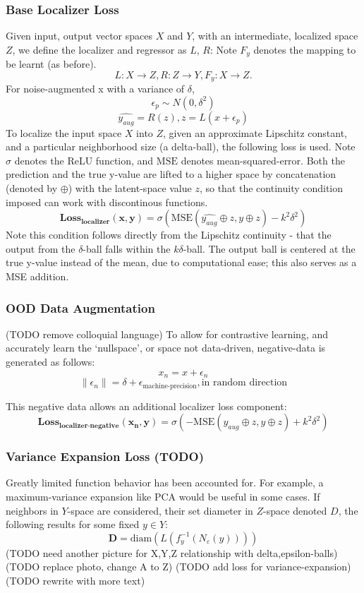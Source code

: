 \subsubsection{Base Localizer Loss}
Given input, output vector spaces $X$ and $Y$, with an intermediate, localized space $Z$, we define the localizer and regressor as $L$, $R$:
Note $F_y$ denotes the mapping to be learnt (as before).
\[
L : X \rightarrow Z, R: Z \rightarrow Y, F_y : X \rightarrow Z.
\]
For noise-augmented x with a variance of $\delta$, 
\[
\epsilon_p \sim N(0,\delta^2)    
\]
\[
\hat{y_{aug}} = R(z), z = L(x + \epsilon_p)
\]
To localize the input space $X$ into $Z$, given an approximate Lipschitz constant, and a particular neighborhood size (a delta-ball), the following loss is used.
Note $\sigma$ denotes the ReLU function, and $\text{MSE}$ denotes mean-squared-error.
Both the prediction and the true y-value are lifted to a higher space by concatenation (denoted by $\oplus$) with the latent-space value $z$, so that the continuity condition imposed can work with discontinous functions.
\[
\mathbf{\text{Loss}_\text{localizer}(x,y)} = \sigma(\text{MSE}(\hat{y_{aug}} \oplus z,y \oplus z) - k^2 \delta^2)
\]
Note this condition follows directly from the Lipschitz continuity - that the output from the $\delta$-ball falls within the $k\delta$-ball.
The output ball is centered at the true y-value instead of the mean, due to computational ease; this also serves as a MSE addition.

\subsubsection{OOD Data Augmentation}
(TODO remove colloquial language)
To allow for contrastive learning, and accurately learn the `nullspace', or space not data-driven, negative-data is generated as follows:
\[
x_n = x + \epsilon_n
\]
\[
\|\epsilon_n\| = \delta + \epsilon_{\text{machine-precision}}, \text{in random direction}
\]

This negative data allows an additional localizer loss component:
\[
\mathbf{\text{Loss}_\text{localizer-negative}(x_n,y)} = \sigma( - \text{MSE}(\hat{y_{aug}} \oplus z,y \oplus z) + k^2 \delta^2)
\]

\subsubsection{Variance Expansion Loss (TODO)}
Greatly limited function behavior has been accounted for. For example, a maximum-variance expansion like PCA would be useful in some cases.
If neighbors in $Y$-space are considered, their set diameter in $Z$-space denoted $D$, the following results for some fixed $y \in Y$:
\[
\mathbf{D} = \text{diam} (L(f^{-1}_y(N_\varepsilon(y))))
\]
(TODO need another picture for X,Y,Z relationship with delta,epsilon-balls)
(TODO replace photo, change A to Z)
(TODO add loss for variance-expansion)
(TODO rewrite with more text)


